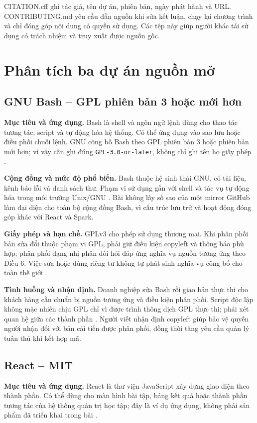 \documentclass[12pt,a4paper]{article}
\begin{document}
CITATION.cff ghi tác giả, tên dự án, phiên bản, ngày phát hành và URL. CONTRIBUTING.md yêu cầu dẫn nguồn khi sửa kết luận, chạy lại chương trình và chỉ đóng góp nội dung có quyền sử dụng. Các tệp này giúp người khác tái sử dụng có trách nhiệm và truy xuất được nguồn gốc.

\section{Phân tích ba dự án nguồn mở}
\subsection{GNU Bash -- GPL phiên bản 3 hoặc mới hơn}
\textbf{Mục tiêu và ứng dụng.} Bash là shell và ngôn ngữ lệnh dùng cho thao tác tương tác, script và tự động hóa hệ thống. Có thể ứng dụng vào sao lưu hoặc điều phối chuỗi lệnh. GNU công bố Bash theo GPL phiên bản 3 hoặc phiên bản mới hơn; vì vậy cần ghi đúng \texttt{GPL-3.0-or-later}, không chỉ ghi tên họ giấy phép \cite{bash}.

\textbf{Cộng đồng và mức độ phổ biến.} Bash thuộc hệ sinh thái GNU, có tài liệu, kênh báo lỗi và danh sách thư. Phạm vi sử dụng gắn với shell và tác vụ tự động hóa trong môi trường Unix/GNU \cite{bash,bashmanual}. Bài không lấy số sao của một mirror GitHub làm đại diện cho toàn bộ cộng đồng Bash, vì cấu trúc lưu trữ và hoạt động đóng góp khác với React và Spark.

\textbf{Giấy phép và hạn chế.} GPLv3 cho phép sử dụng thương mại. Khi phân phối bản sửa đổi thuộc phạm vi GPL, phải giữ điều kiện copyleft và thông báo phù hợp; phân phối dạng nhị phân đòi hỏi đáp ứng nghĩa vụ nguồn tương ứng theo Điều 6. Việc sửa hoặc dùng riêng tư không tự phát sinh nghĩa vụ công bố cho toàn thế giới \cite{gpl}.

\textbf{Tình huống và nhận định.} Doanh nghiệp sửa Bash rồi giao bản thực thi cho khách hàng cần chuẩn bị nguồn tương ứng và điều kiện phân phối. Script độc lập không mặc nhiên chịu GPL chỉ vì được trình thông dịch GPL thực thi; phải xét quan hệ giữa các thành phần \cite{gplfaq}. Người viết nhận định copyleft giúp bảo vệ quyền người nhận đối với bản cải tiến được phân phối, đồng thời tăng yêu cầu quản lý tuân thủ khi kết hợp mã.

\subsection{React -- MIT}
\textbf{Mục tiêu và ứng dụng.} React là thư viện JavaScript xây dựng giao diện theo thành phần. Có thể dùng cho màn hình bài tập, bảng kết quả hoặc thành phần tương tác của hệ thống quản trị học tập; đây là ví dụ ứng dụng, không phải sản phẩm đã triển khai trong bài \cite{react}.
\end{document}
